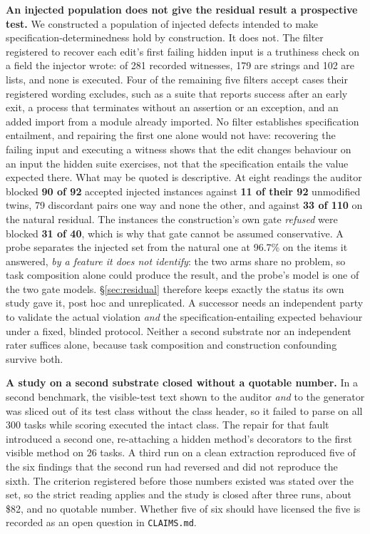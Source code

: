 \textbf{An injected population does not give the residual result a prospective test.} We
constructed a population of injected defects intended to make specification-determinedness hold
by construction. It does not. The filter registered to recover each edit's first failing hidden
input is a truthiness check on a field the injector wrote: of 281 recorded witnesses, 179 are
strings and 102 are lists, and none is executed. Four of the remaining five filters accept cases
their registered wording excludes, such as a suite that reports success after an early exit, a
process that terminates without an assertion or an exception, and an added import from a module
already imported. No filter establishes specification entailment, and repairing the first one
alone would not have: recovering the failing input and executing a witness shows that the edit
changes behaviour on an input the hidden suite exercises, not that the specification entails the
value expected there. What may be quoted is descriptive. At eight readings the auditor blocked
\textbf{90 of 92} accepted injected instances against \textbf{11 of their 92} unmodified twins,
79 discordant pairs one way and none the other, and against \textbf{33 of 110} on the natural
residual. The instances the construction's own gate \emph{refused} were blocked \textbf{31 of 40},
which is why that gate cannot be assumed conservative. A probe separates the injected set from the
natural one at 96.7\% on the items it answered, \emph{by a feature it does not identify}: the two
arms share no problem, so task composition alone could produce the result, and the probe's model
is one of the two gate models. \S\ref{sec:residual} therefore keeps exactly the status its own
study gave it, post hoc and unreplicated. A successor needs an independent party to validate the
actual violation \emph{and} the specification-entailing expected behaviour under a fixed, blinded
protocol. Neither a second substrate nor an independent rater suffices alone, because task
composition and construction confounding survive both.

\textbf{A study on a second substrate closed without a quotable number.} In a second benchmark,
the visible-test text shown to the auditor \emph{and} to the generator was sliced out of its test
class without the class header, so it failed to parse on all 300 tasks while scoring executed the
intact class. The repair for that fault introduced a second one, re-attaching a hidden method's
decorators to the first visible method on 26 tasks. A third run on a clean extraction reproduced
five of the six findings that the second run had reversed and did not reproduce the sixth. The
criterion registered before those numbers existed was stated over the set, so the strict reading
applies and the study is closed after three runs, about \$82, and no quotable number. Whether five
of six should have licensed the five is recorded as an open question in \texttt{CLAIMS.md}.

